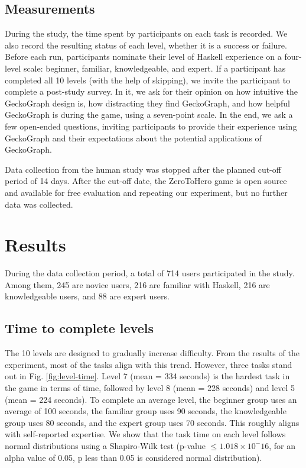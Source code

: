 \subsection{Measurements}
During the study, the time spent by participants on each task is recorded. We also record the resulting status of each level, whether it is a success or failure. Before each run, participants nominate their level of Haskell experience on a four-level scale: beginner, familiar,  knowledgeable, and expert.  If a participant has completed all 10 levels (with the help of skipping), we invite the participant to complete a post-study survey. In it, we ask for their opinion on how intuitive the GeckoGraph design is, how distracting they find GeckoGraph, and how helpful GeckoGraph is during the game, using a seven-point scale. In the end, we ask a few open-ended questions, inviting participants to provide their experience using GeckoGraph and their expectations about the potential applications of GeckoGraph.

Data collection from the human study was stopped after the planned cut-off period of 14 days. After the cut-off date, the ZeroToHero game is open source and available for free evaluation \cite{Anonymous_undated-ne} and repeating our experiment, but no further data was collected. 

\section{Results}

During the data collection period, a total of 714 users participated in the study. Among them, 245 are novice users, 216 are familiar with Haskell, 216 are knowledgeable users, and 88 are expert users. 


\subsection{Time to complete levels}

The 10 levels are designed to gradually increase difficulty. From the results of the experiment, most of the tasks align with this trend. However, three tasks stand out in Fig. \ref{fig:level-time}.  Level 7 (mean = 334 seconds) is the hardest task in the game in terms of time, followed by level 8 (mean = 228 seconds) and level 5 (mean = 224 seconds). To complete an average level, the beginner group uses an average of 100 seconds, the familiar group uses 90 seconds, the knowledgeable group uses 80 seconds, and the expert group uses 70 seconds. This roughly aligns with self-reported expertise. We show that the task time on each level follows normal distributions using a Shapiro-Wilk test \cite{Shaphiro1965-dx} (p-value  $ \leq 1.018 \times 10^-16$, for an alpha value of 0.05, p less than 0.05 is considered normal distribution).

